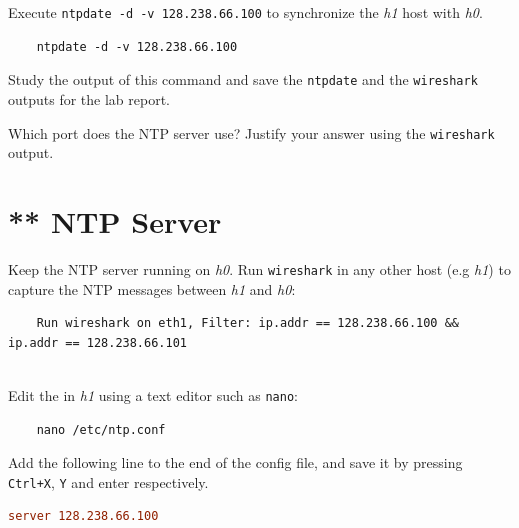 \documentclass{UTNetLab}
\begin{document}
   
   Execute \lstinline{ntpdate -d -v 128.238.66.100} to synchronize the \textit{h1} host with \textit{h0}.
    
    \begin{lstlisting}
    ntpdate -d -v 128.238.66.100
    \end{lstlisting}
    
    Study the output of this command and save the \lstinline{ntpdate} and the \lstinline{wireshark} outputs for the lab report.
    
    \begin{report}
    \item Which port does the NTP server use?
    Justify your answer using the \lstinline{wireshark} output.
    \end{report}

\section{** NTP Server}
    Keep the NTP server running on \textit{h0}. Run  \lstinline{wireshark} in any other host (e.g \textit{h1}) to capture the NTP messages between \textit{h1} and \textit{h0}:
    
    \begin{lstlisting}
    Run wireshark on eth1, Filter: ip.addr == 128.238.66.100 && ip.addr == 128.238.66.101
       
    \end{lstlisting}
    

    Edit the  in \textit{h1} using a text editor such as \lstinline{nano}:
    
    \begin{lstlisting}
    nano /etc/ntp.conf
    \end{lstlisting}
    
     Add the following line to the end of the config file, and save it by pressing \lstinline{Ctrl+X}, \lstinline{Y} and enter respectively.
    
    \begin{lstlisting}[language={conf}]
    server 128.238.66.100
    \end{lstlisting}
    
\end{document}
